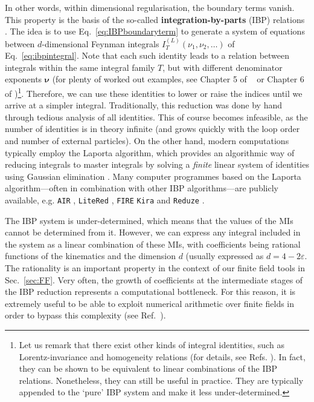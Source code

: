 \documentclass[main.tex]{subfiles}
\begin{document}
In other words, within dimensional regularisation, the boundary terms vanish. This property is the basis of the so-called \textbf{integration-by-parts} (IBP) relations \cite{Chetyrkin:1981qh}. The idea is to use Eq.~\ref{eq:IBPboundaryterm} to generate a system of equations between $d$-dimensional Feynman integrals $I_T^{(L)}(\nu_1, \nu_2, \ldots)$ of Eq.~\ref{eq:ibpintegral}. Note that each such identity leads to a relation between integrals within the same integral family $T$, but with different denominator exponents $\bm{\nu}$ (for plenty of worked out examples, see Chapter 5 of ~\cite{smirnov2006feynman} or Chapter 6 of \cite{Weinzierl:2022eaz})\footnote{Let us remark that there exist other kinds of integral identities, such as Lorentz-invariance and homogeneity relations (for details, see Refs. \cite{Grozin:2011mt, Lee:2008tj, Lee:2012cn}). In fact, they can be shown to be equivalent to linear combinations of the IBP relations. Nonetheless, they can still be useful in practice. They are typically appended to the `pure' IBP system and make it less under-determined.}. Therefore, we can use these identities to lower or raise the indices until we arrive at a simpler integral. Traditionally, this reduction was done by hand through tedious analysis of all identities. This of course becomes infeasible, as the number of identities is in theory infinite (and grows quickly with the loop order and number of external particles). On the other hand, modern computations typically employ the Laporta algorithm, which provides an algorithmic way of reducing integrals to master integrals by solving a \textit{finite} linear system of identities using Gaussian elimination \cite{Laporta:2001dd}. Many computer programmes based on the Laporta algorithm---often in combination with other IBP algorithms---are publicly available, e.g. \texttt{AIR} \cite{Anastasiou:2004vj}, \texttt{LiteRed} \cite{Lee:2012cn, Lee:2013mka}, \texttt{FIRE} \cite{Smirnov:2008iw, Smirnov:2019qkx} \texttt{Kira} \cite{Maierhofer:2017gsa, Klappert:2020nbg} and \texttt{Reduze} \cite{Studerus:2009ye, vonManteuffel:2012np}.

The IBP system is under-determined, which means that the values of the MIs cannot be determined from it. However, we can express any integral included in the system as a linear combination of these MIs, with coefficients being rational functions of the kinematics and the dimension $d$ (usually expressed as $d=4-2\varepsilon$. The rationality is an important property in the context of our finite field tools in Sec.~\ref{sec:FF}. Very often, the growth of coefficients at the intermediate stages of the IBP reduction represents a computational bottleneck. For this reason, it is extremely useful to be able to exploit numerical arithmetic over finite fields in order to bypass this complexity (see Ref.~\cite{Peraro:2019svx}).
\end{document}
